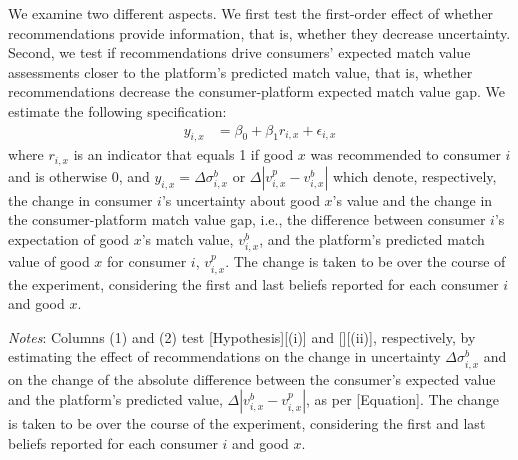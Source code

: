 \documentclass[12pt]{article}
\theoremstyle{newtheorem}
\begin{document}
We examine two different aspects.
We first test the first-order effect of whether recommendations provide information, that is, whether they decrease uncertainty. 
Second, we test if recommendations drive consumers' expected match value assessments closer to the platform's predicted match value, that is, whether recommendations decrease the consumer-platform expected match value gap.
We estimate the following specification:
\begin{align}
 \label{equation:rec-on-beliefs}
 y_{i,x} &= \beta_0 + \beta_1 r_{i,x} + \epsilon_{i,x}
\end{align}
where $r_{i,x}$ is an indicator that equals 1 if good $x$ was recommended to consumer $i$ and is otherwise 0, and $y_{i,x}=\Delta \sigma_{i,x}^b$ or $\Delta |v_{i,x}^p-v_{i,x}^b|$ which denote, respectively, the change in consumer $i$'s uncertainty about good $x$'s value and the change in the consumer-platform match value gap, i.e., the difference between consumer $i$'s expectation of good $x$'s match value, $v_{i,x}^b$, and the platform's predicted match value of good $x$ for consumer $i$, $v_{i,x}^p$.
The change is taken to be over the course of the experiment, considering the first and last beliefs reported for each consumer $i$ and good $x$.

\begin{table}[t]
	\centering
	
    \begin{minipage}{1\textwidth}
        \vspace*{.5em}
        \caption{The Impact of Recommendation on Beliefs ([Hypothesis])}
        \label{table:reg-beliefs-on-rec}
         \emph{Notes}:
        Columns (1) and (2) test [Hypothesis][(i)] and [][(ii)], respectively, by estimating the effect of recommendations on the change in uncertainty $\Delta \sigma_{i,x}^b$ and on the change of the absolute difference between the consumer's expected value and the platform's predicted value, $\Delta |v_{i,x}^b-v_{i,x}^p|$, as per [Equation]. 
        The change is taken to be over the course of the experiment, considering the first and last beliefs reported for each consumer $i$ and good $x$.
    \end{minipage}
\end{table}
\end{document}
